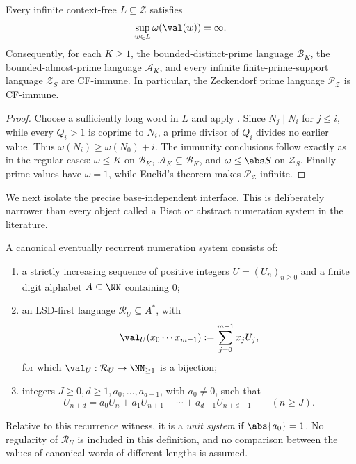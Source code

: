 \begin{corollary}
  \label{cor:zeckendorf-context-free-immunity-package}
  Every infinite context-free \(L\subseteq\mathcal Z\) satisfies
  \[
    \sup_{w\in L}\omega(\val(w))=\infty.
  \]
  Consequently, for each \(K\ge1\), the bounded-distinct-prime language
  \(\mathcal B_K\), the bounded-almost-prime language \(\mathcal A_K\),
  and every infinite finite-prime-support language \(\mathcal Z_S\)
  are CF-immune. In particular, the Zeckendorf prime language
  \(\mathcal P_{\mathcal Z}\) is CF-immune.
\end{corollary}

\begin{proof}
  Choose a sufficiently long word in \(L\) and apply
  . Since
  \(N_j\mid N_i\) for \(j\le i\), while every \(Q_i>1\) is coprime to
  \(N_i\), a prime divisor of \(Q_i\) divides no earlier value. Thus
  \(\omega(N_i)\ge\omega(N_0)+i\). The immunity conclusions follow
  exactly as in the regular cases: \(\omega\le K\) on \(\mathcal B_K\),
  \(\mathcal A_K\subseteq\mathcal B_K\), and
  \(\omega\le\abs S\) on \(\mathcal Z_S\). Finally prime values have
  \(\omega=1\), while Euclid's theorem makes
  \(\mathcal P_{\mathcal Z}\) infinite.
\end{proof}

We next isolate the precise base-independent interface. This is
deliberately narrower than every object called a Pisot or abstract
numeration system in the literature.

\begin{definition}
  \label{def:canonical-eventually-recurrent-numeration}
  A canonical eventually recurrent numeration system consists of:
  \begin{enumerate}[label={}]
    \item[\textup{(U1)}] a strictly increasing sequence of positive integers
    \(U=(U_n)_{n\ge0}\) and a finite digit alphabet
    \(A\subseteq\NN\) containing \(0\);
    \item[\textup{(U2)}] an LSD-first language
    \(\mathcal R_U\subseteq A^\ast\), with
    \[
      \val_U(x_0\cdots x_{m-1})
        :=\sum_{j=0}^{m-1}x_jU_j,
    \]
    for which \(\val_U:\mathcal R_U\to\NN_{\ge1}\) is a bijection;
    \item[\textup{(U3)}] integers \(J\ge0,d\ge1,a_0,\ldots,a_{d-1}\), with
    \(a_0\ne0\), such that
    \[
      U_{n+d}=a_0U_n+a_1U_{n+1}+\cdots+a_{d-1}U_{n+d-1}
      \qquad(n\ge J).
    \]
  \end{enumerate}
  Relative to this recurrence witness, it is a \emph{unit system} if
  \(\abs{a_0}=1\). No regularity of \(\mathcal R_U\) is included in
  this definition, and no comparison between the values of canonical words
  of different lengths is assumed.
\end{definition}

